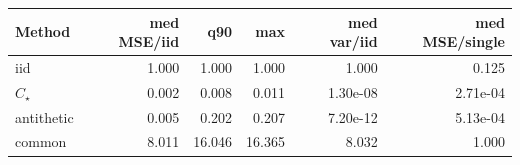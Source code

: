 \begin{tabular}{lrrrrr}
\toprule
Method & med MSE/iid & q90 & max & med var/iid & med MSE/single \\
\midrule
iid & 1.000 & 1.000 & 1.000 & 1.000 & 0.125 \\
$C_\star$ & 0.002 & 0.008 & 0.011 & 1.30e-08 & 2.71e-04 \\
antithetic & 0.005 & 0.202 & 0.207 & 7.20e-12 & 5.13e-04 \\
common & 8.011 & 16.046 & 16.365 & 8.032 & 1.000 \\
\bottomrule
\end{tabular}
